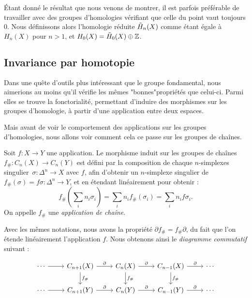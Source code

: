 \begin{remark}
Étant donné le résultat que nous venons de montrer, il est parfois préférable de travailler avec des groupes d'homologies vérifiant que celle du point vaut toujours 0. Nous définissons alors l'homologie réduite $\Tilde{H}_n(X)$ comme étant égale à $H_n(X)$ pour $n>1$, et $H_0(X)=\Tilde{H}_0(X)\oplus\mathbb{Z}$.
\end{remark}

\subsection{Invariance par homotopie}

Dans une quête d'outils plus intéressant que le groupe fondamental, nous aimerions au moins qu'il vérifie les mêmes "bonnes"propriétés que celui-ci. Parmi elles se trouve la fonctorialité, permettant d'induire des morphismes sur les groupes d'homologie, à partir d'une application entre deux espaces.

Mais avant de voir le comportement des applications sur les groupes d'homologies, nous allons voir comment cela ce passe sur les groupes  de chaînes.

\begin{definition}\label{def:chain-map}
Soit $f:X\to Y$ une application. Le morphisme induit sur les groupes de chaînes~$f_\#:C_n(X)\to C_n(Y)$ est défini par la composition de chaque $n$-simplexes singulier~$\sigma:\Delta^n\to X$ avec $f$, afin d'obtenir un $n$-simplexe singulier de $f_\#(\sigma)=f\sigma:\Delta^n\to Y$, et en étendant linéairement pour obtenir : \[f_\#\left(\sum_in_i\sigma_i\right)=\sum_in_if_\#(\sigma_i)=\sum_in_if\sigma_i.\]On appelle $f_\#$ une \emph{application de chaîne}.
\end{definition}

Avec les mêmes notations, nous avons la propriété $\partial f_\#=f_\#\partial$, du fait que l'on étende linéairement l'application $f$. Nous obtenons ainsi le \emph{diagramme commutatif} suivant :

\[\begin{tikzcd}
\cdots\arrow[r]&C_{n+1}(X)\arrow[r,"\partial"]\arrow[d,"f_\#"]&C_n(X)\arrow[r,"\partial"]\arrow[d,"f_\#"]&C_{n-1}(X)\arrow[r,"\partial"]\arrow[d,"f_\#"]&\cdots\\
\cdots\arrow[r]&C_{n+1}(Y)\arrow[r,"\partial"]&C_n(Y)\arrow[r,"\partial"]&C_{n-1}(Y)\arrow[r,"\partial"]&\cdots\\
\end{tikzcd}\]

